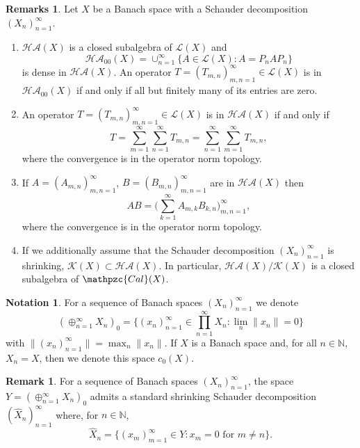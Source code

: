 \documentclass[11pt]{amsart}
\theoremstyle{definition}
\newtheorem{remark}[theorem]{Remark}
\newtheorem{notation}[theorem]{Notation}
\newtheorem*{remarks}{Remarks}
\newcommand{\N}{\mathbb{N}}
\numberwithin{equation}{section}
\begin{document}
\begin{remarks}
Let $X$ be a Banach space with a Schauder decomposition $(X_n)_{n=1}^\infty$.
\begin{enumerate}[leftmargin=21pt,label=(\roman*)]

    \item  $\mathcal{HA}(X)$ is a closed subalgebra of $\mathcal{L}(X)$ and
    \[\mathcal{HA}_{00}(X) = \cup_{n=1}^\infty\big\{A\in\mathcal{L}(X): A = P_nAP_n\big\}\]
    is dense in $\mathcal{HA}(X)$. An operator $T = (T_{m,n})_{m,n=1}^\infty\in\mathcal{L}(X)$ is in $\mathcal{HA}_{00}(X)$ if and only if all but finitely many of its entries are zero.

    \item An operator $T = (T_{m,n})_{m,n=1}^\infty\in\mathcal{L}(X)$ is in $\mathcal{HA}(X)$ if and only if
    \[T = \sum_{m=1}^\infty\sum_{n=1}^\infty T_{m,n} = \sum_{n=1}^\infty\sum_{m=1}^\infty T_{m,n},\]
where the convergence is in the operator norm topology.
    
    \item If $A = (A_{m,n})_{m,n=1}^\infty$, $B = (B_{m,n})_{m,n=1}^\infty$ are in $\mathcal{HA}(X)$ then
    \[AB = \Big(\sum_{k=1}^\infty A_{m,k}B_{k,n}\Big)_{m,n=1}^\infty,\]
where the convergence is in the operator norm topology.

    
    
    \item If we additionally assume that the Schauder decomposition $(X_n)_{n=1}^\infty$ is shrinking, $\mathcal{K}(X)\subset \mathcal{HA}(X)$. In particular, $\mathcal{HA}(X)/\mathcal{K}(X)$ is a closed subalgebra of $\mathpzc{Cal}(X)$.
    
    
            
\end{enumerate}
\end{remarks}





\begin{notation}
For a sequence of Banach spaces $(X_n)_{n=1}^\infty$ we denote
    \[(\oplus_{n=1}^\infty X_n)_{0} = \Big\{(x_n)_{n=1}^\infty\in \prod_{n=1}^\infty X_n:\lim_n\|x_n\| = 0\Big\}\]
with $\|(x_n)_{n=1}^\infty\| = \max_n\|x_n\|$. If $X$ is a Banach space and, for all $n\in\N$, $X_n = X$, then we denote this space $c_0(X)$.
\end{notation}

\begin{remark}
For a sequence of Banach spaces $(X_n)_{n=1}^\infty$, the space $Y = (\oplus_{n=1}^\infty X_n)_{0}$ admits a standard shrinking Schauder decomposition $(\hat X_n)_{n=1}^\infty$ where, for $n\in\N$,
\[\hat X_n = \Big\{(x_m)_{m=1}^\infty\in Y: x_m = 0\text{ for }m\neq n\Big\}.\]
\end{remark}
\end{document}
